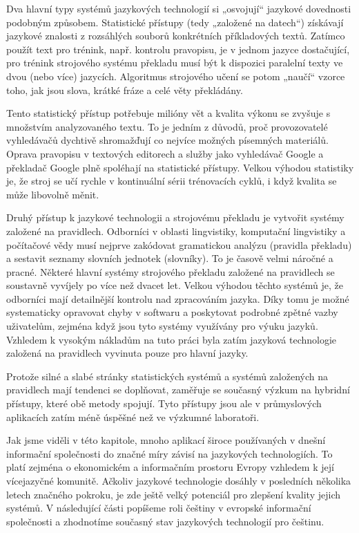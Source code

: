 \documentclass[]{../../metanetpaper}
\begin{document}
\begin{multicols}{2}
Dva hlavní typy systémů jazykových technologií si „osvojují“ jazykové dovednosti podobným způsobem. Statistické přístupy (tedy „založené na datech“) získávají jazykové znalosti z rozsáhlých souborů konkrétních příkladových textů. Zatímco použít text pro trénink, např. kontrolu pravopisu, je v jednom jazyce dostačující, pro trénink strojového systému překladu musí být k dispozici paralelní texty ve dvou (nebo více) jazycích. Algoritmus strojového učení se potom „naučí“ vzorce toho, jak jsou slova, krátké fráze a celé věty překládány.

Tento statistický přístup potřebuje milióny vět a kvalita výkonu se zvyšuje s množstvím analyzovaného textu. To je jedním z důvodů, proč provozovatelé vyhledávačů dychtivě shromažďují co nejvíce možných písemných materiálů. Oprava pravopisu v textových editorech a služby jako vyhledávač Google a překladač Google plně spoléhají na statistické přístupy. Velkou výhodou statistiky je, že stroj se učí rychle v kontinuální sérii trénovacích cyklů, i když kvalita se může libovolně měnit.

Druhý přístup k jazykové technologii a strojovému překladu je vytvořit systémy založené na pravidlech. Odborníci v oblasti lingvistiky, komputační lingvistiky a počítačové vědy musí nejprve zakódovat gramatickou analýzu (pravidla překladu) a sestavit seznamy slovních jednotek (slovníky). To je časově velmi náročné a pracné. Některé hlavní systémy strojového překladu založené na pravidlech se soustavně vyvíjely po více než dvacet let. Velkou výhodou těchto systémů je, že odborníci mají detailnější kontrolu nad zpracováním jazyka. Díky tomu je možné systematicky opravovat chyby v softwaru a poskytovat podrobné zpětné vazby uživatelům, zejména když jsou tyto systémy využívány pro výuku jazyků. Vzhledem k vysokým nákladům na tuto práci byla zatím jazyková technologie založená na pravidlech vyvinuta pouze pro hlavní jazyky.

Protože silné a slabé stránky statistických systémů a systémů založených na pravidlech mají tendenci se doplňovat, zaměřuje se současný výzkum na hybridní přístupy, které obě metody spojují. Tyto přístupy jsou ale v průmyslových aplikacích zatím méně úspěšné než ve výzkumné laboratoři.

Jak jsme viděli v této kapitole, mnoho aplikací široce používaných v dnešní informační společnosti do značné míry závisí na jazykových technologiích. To platí zejména o ekonomickém a informačním prostoru Evropy vzhledem k její vícejazyčné komunitě. Ačkoliv jazykové technologie dosáhly v posledních několika letech značného pokroku, je zde ještě velký potenciál pro zlepšení kvality jejich systémů. V následující části popíšeme roli češtiny v evropské informační společnosti a zhodnotíme současný stav jazykových technologií pro češtinu.
\end{multicols}
\clearpage
\end{document}
